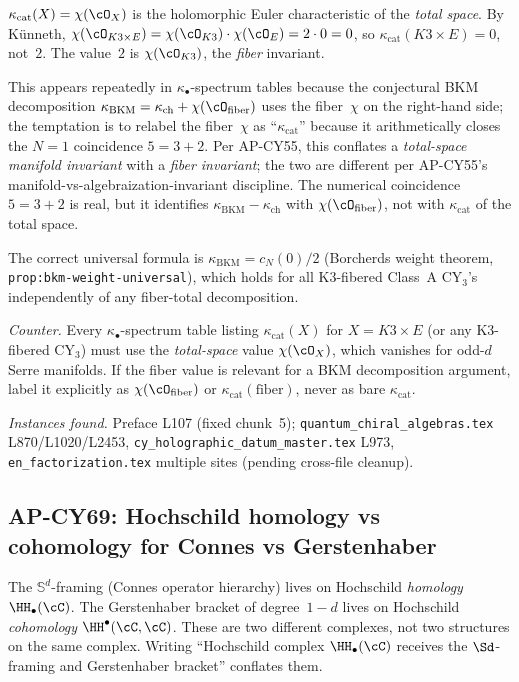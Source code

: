 $\kappa_{\mathrm{cat}}(X) = \chi(\cO_X)$ is the holomorphic Euler
characteristic of the \emph{total space}.  By K\"unneth,
$\chi(\cO_{K3 \times E}) = \chi(\cO_{K3}) \cdot \chi(\cO_E)
= 2 \cdot 0 = 0$, so
$\kappa_{\mathrm{cat}}(K3 \times E) = 0$, not~$2$.
The value~$2$ is $\chi(\cO_{K3})$, the \emph{fiber} invariant.

This appears repeatedly in $\kappa_\bullet$-spectrum tables because
the conjectural BKM decomposition
$\kappa_{\mathrm{BKM}} = \kappa_{\mathrm{ch}} + \chi(\cO_{\mathrm{fiber}})$
uses the fiber~$\chi$ on the right-hand side; the temptation is to
relabel the fiber~$\chi$ as ``$\kappa_{\mathrm{cat}}$'' because it
arithmetically closes the $N{=}1$ coincidence
$5 = 3 + 2$.  Per AP-CY55, this conflates a \emph{total-space
manifold invariant} with a \emph{fiber invariant}; the two are
different per AP-CY55's manifold-vs-algebraization-invariant
discipline.  The numerical coincidence $5 = 3 + 2$ is real, but it
identifies $\kappa_{\mathrm{BKM}} - \kappa_{\mathrm{ch}}$ with
$\chi(\cO_{\mathrm{fiber}})$, not with $\kappa_{\mathrm{cat}}$ of
the total space.

The correct universal formula is $\kappa_{\mathrm{BKM}} = c_N(0)/2$
(Borcherds weight theorem, \verb|prop:bkm-weight-universal|), which
holds for all K3-fibered Class~A CY$_3$'s independently of any
fiber-total decomposition.

\emph{Counter.}  Every $\kappa_\bullet$-spectrum table listing
$\kappa_{\mathrm{cat}}(X)$ for $X = K3 \times E$ (or any K3-fibered
CY$_3$) must use the \emph{total-space} value $\chi(\cO_X)$, which
vanishes for odd-$d$ Serre manifolds.  If the fiber value is
relevant for a BKM decomposition argument, label it explicitly as
$\chi(\cO_{\mathrm{fiber}})$ or $\kappa_{\mathrm{cat}}(\mathrm{fiber})$,
never as bare $\kappa_{\mathrm{cat}}$.

\emph{Instances found.}  Preface L107 (fixed chunk~5);
\verb|quantum_chiral_algebras.tex| L870/L1020/L2453,
\verb|cy_holographic_datum_master.tex| L973,
\verb|en_factorization.tex| multiple sites (pending cross-file
cleanup).

\subsection{AP-CY69: Hochschild homology vs cohomology for Connes vs
  Gerstenhaber}

The $\mathbb{S}^d$-framing (Connes operator hierarchy) lives on
Hochschild \emph{homology} $\HH_\bullet(\cC)$.  The Gerstenhaber
bracket of degree~$1 - d$ lives on Hochschild \emph{cohomology}
$\HH^\bullet(\cC, \cC)$.  These are two different complexes, not
two structures on the same complex.  Writing ``Hochschild complex
$\HH_\bullet(\cC)$ receives the $\Sd$-framing and Gerstenhaber
bracket'' conflates them.

